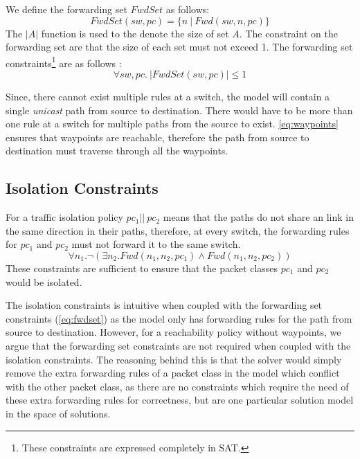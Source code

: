 We define the forwarding set $FwdSet$ as follows:
\begin{equation}
	FwdSet(sw,pc) = \{n \ | \ Fwd(sw,n,pc)\}
\end{equation}
The $|A|$ function is used to the denote the size of set $A$. The constraint on the forwarding set are that the size of each set must not exceed 1. The forwarding set constraints\footnote{
	These constraints are expressed completely in SAT.} are as follows : 
\begin{equation}
		\forall sw,pc . \ |FwdSet(sw,pc)| \leq 1 \label{eq:fwdset}
\end{equation}

Since, there cannot exist multiple rules at a switch, the model will contain a 
single {\em unicast} path from source to destination. There would have to 
be more than one rule at a switch for multiple paths from the source to exist. 
\cref{eq:waypoints} ensures that waypoints are reachable, therefore
 the path from source to destination must traverse through all the waypoints. 

\subsection{Isolation Constraints}
For a traffic isolation policy $pc_1 || \ pc_2$ means that the paths do not share an link in the same direction in their paths, therefore, at every switch, the forwarding rules for $pc_1$ and $pc_2$ must not forward it to the same switch.  
\begin{equation}
	\forall n_1. \neg ( \exists n_2. Fwd(n_1,n_2,pc_1) \wedge Fwd(n_1,n_2,pc_2)) \label{eq:isolation}
\end{equation}
These constraints are sufficient to ensure that the packet classes $pc_1$ and $pc_2$ would be isolated. 

The isolation constraints is intuitive when coupled with the forwarding set constraints (\cref{eq:fwdset}) as the model only has forwarding rules for the path from source to destination. However, for a reachability policy without waypoints, we argue that the forwarding set constraints are not required when coupled with the isolation constraints. The reasoning behind this is that the solver would simply remove the extra forwarding rules of a packet class in the model which conflict with the other packet class, as there are no constraints which require the need of these extra forwarding rules for correctness, but are one particular solution model in the space of solutions. 

